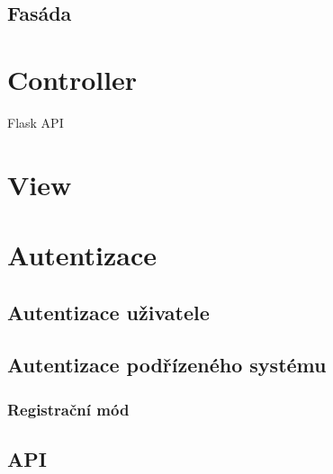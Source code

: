 \subsection{Fasáda}

\section{Controller}

Flask API

\section{View}

\section{Autentizace}

\subsection{Autentizace uživatele}

\subsection{Autentizace podřízeného systému}

\subsubsection{Registrační mód}

\subsection{API}
